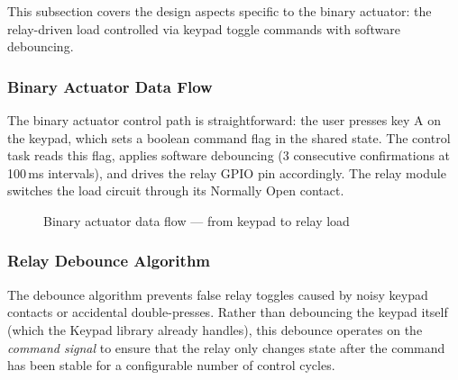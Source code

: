 This subsection covers the design aspects specific to the binary actuator: the relay-driven load controlled via keypad toggle commands with software debouncing.

\subsubsection{Binary Actuator Data Flow}

The binary actuator control path is straightforward: the user presses key A on the keypad, which sets a boolean command flag in the shared state. The control task reads this flag, applies software debouncing (3 consecutive confirmations at 100\,ms intervals), and drives the relay GPIO pin accordingly. The relay module switches the load circuit through its Normally Open contact.

\begin{figure}[H]
\centering
{}
\caption{Binary actuator data flow --- from keypad to relay load}
\label{fig:binary_data_flow}
\end{figure}

\subsubsection{Relay Debounce Algorithm}

The debounce algorithm prevents false relay toggles caused by noisy keypad contacts or accidental double-presses. Rather than debouncing the keypad itself (which the Keypad library already handles), this debounce operates on the \emph{command signal} to ensure that the relay only changes state after the command has been stable for a configurable number of control cycles.

